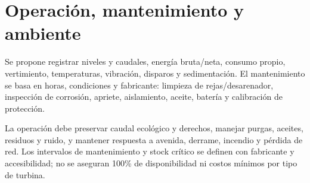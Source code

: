\section{Operación, mantenimiento y ambiente}
Se propone registrar niveles y caudales, energía bruta/neta, consumo propio, vertimiento, temperaturas, vibración, disparos y sedimentación. El mantenimiento se basa en horas, condiciones y fabricante: limpieza de rejas/desarenador, inspección de corrosión, apriete, aislamiento, aceite, batería y calibración de protección.

La operación debe preservar caudal ecológico y derechos, manejar purgas, aceites, residuos y ruido, y mantener respuesta a avenida, derrame, incendio y pérdida de red. Los intervalos de mantenimiento y stock crítico se definen con fabricante y accesibilidad; no se aseguran 100\% de disponibilidad ni costos mínimos por tipo de turbina.
